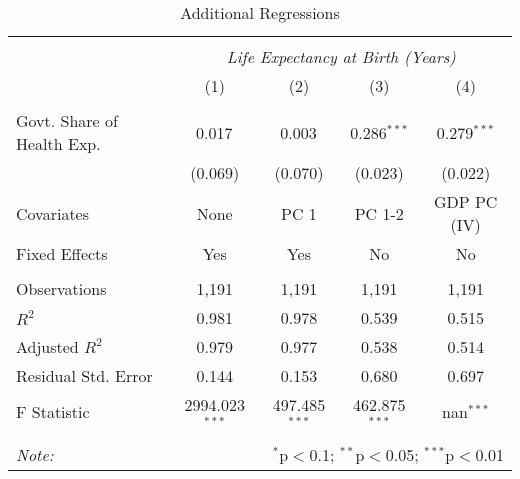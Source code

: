 \begin{table}[!htbp] \centering
  \caption{Additional Regressions \label{additional_regs}}
\begin{tabular}{@{\extracolsep{5pt}}lcccc}
\\[-1.8ex]\hline
\hline \\[-1.8ex]
& \multicolumn{4}{c}{\textit{Life Expectancy at Birth (Years)}} \
\cr \
\\[-1.8ex] & (1) & (2) & (3) & (4) \\
\hline \\[-1.8ex]
 Govt. Share of Health Exp. & 0.017$^{}$ & 0.003$^{}$ & 0.286$^{***}$ & 0.279$^{***}$ \\
  & (0.069) & (0.070) & (0.023) & (0.022) \\
 Covariates & None & PC 1 & PC 1-2 & GDP PC (IV) \\
 Fixed Effects & Yes & Yes & No & No \\
\hline \\[-1.8ex]
 Observations & 1,191 & 1,191 & 1,191 & 1,191 \\
 $R^2$ & 0.981 & 0.978 & 0.539 & 0.515 \\
 Adjusted $R^2$ & 0.979 & 0.977 & 0.538 & 0.514 \\
 Residual Std. Error & 0.144 & 0.153 & 0.680 & 0.697  \\
 F Statistic & 2994.023$^{***}$  & 497.485$^{***}$  & 462.875$^{***}$  & nan$^{***}$  \\
\hline
\hline \\[-1.8ex]
\textit{Note:} & \multicolumn{4}{r}{$^{*}$p$<$0.1; $^{**}$p$<$0.05; $^{***}$p$<$0.01} \\
\end{tabular}
\end{table}